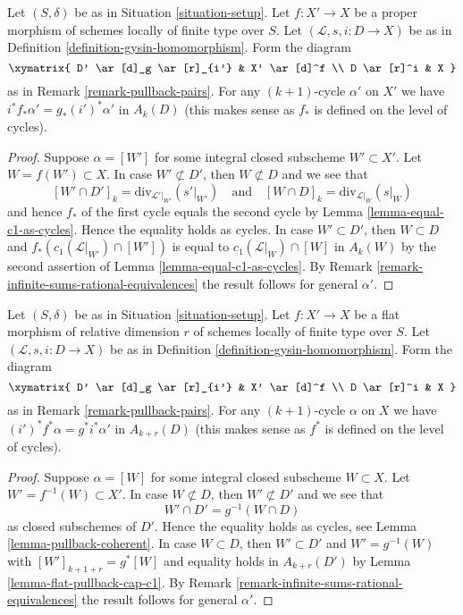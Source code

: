 \begin{lemma}
\label{lemma-closed-in-X-gysin}
Let $(S, \delta)$ be as in Situation \ref{situation-setup}.
Let $f : X' \to X$ be a proper morphism of schemes
locally of finite type over $S$.
Let $(\mathcal{L}, s, i : D \to X)$ be as in
Definition \ref{definition-gysin-homomorphism}.
Form the diagram
$$
\xymatrix{
D' \ar[d]_g \ar[r]_{i'} & X' \ar[d]^f \\
D \ar[r]^i & X
}
$$
as in Remark \ref{remark-pullback-pairs}.
For any $(k + 1)$-cycle $\alpha'$ on $X'$ we have
$i^*f_*\alpha' = g_*(i')^*\alpha'$ in $A_k(D)$
(this makes sense as $f_*$ is defined on the level of cycles).
\end{lemma}

\begin{proof}
Suppose $\alpha = [W']$ for some integral closed subscheme
$W' \subset X'$. Let $W = f(W') \subset X$. In case $W' \not \subset D'$,
then $W \not \subset D$ and we see that
$$
[W' \cap D']_k = \text{div}_{\mathcal{L}'|_{W'}}({s'|_{W'}})
\quad\text{and}\quad
[W \cap D]_k = \text{div}_{\mathcal{L}|_W}(s|_W)
$$
and hence $f_*$ of the first cycle equals the second cycle by
Lemma \ref{lemma-equal-c1-as-cycles}. Hence the
equality holds as cycles. In case $W' \subset D'$, then
$W \subset D$ and $f_*(c_1(\mathcal{L}|_{W'}) \cap [W'])$
is equal to $c_1(\mathcal{L}|_W) \cap [W]$ in $A_k(W)$ by the second
assertion of Lemma \ref{lemma-equal-c1-as-cycles}.
By Remark \ref{remark-infinite-sums-rational-equivalences}
the result follows for general $\alpha'$.
\end{proof}

\begin{lemma}
\label{lemma-gysin-flat-pullback}
Let $(S, \delta)$ be as in Situation \ref{situation-setup}. Let $f : X' \to X$
be a flat morphism of relative dimension $r$ of schemes locally of finite type
over $S$. Let $(\mathcal{L}, s, i : D \to X)$ be as in
Definition \ref{definition-gysin-homomorphism}. Form the diagram
$$
\xymatrix{
D' \ar[d]_g \ar[r]_{i'} & X' \ar[d]^f \\
D \ar[r]^i & X
}
$$
as in Remark \ref{remark-pullback-pairs}.
For any $(k + 1)$-cycle $\alpha$ on $X$ we have
$(i')^*f^*\alpha = g^*i^*\alpha'$ in $A_{k + r}(D)$
(this makes sense as $f^*$ is defined on the level of cycles).
\end{lemma}

\begin{proof}
Suppose $\alpha = [W]$ for some integral closed subscheme
$W \subset X$. Let $W' = f^{-1}(W) \subset X'$. In case $W \not \subset D$,
then $W' \not \subset D'$ and we see that
$$
W' \cap D' = g^{-1}(W \cap D)
$$
as closed subschemes of $D'$. Hence the
equality holds as cycles, see Lemma \ref{lemma-pullback-coherent}.
In case $W \subset D$, then $W' \subset D'$ and $W' = g^{-1}(W)$
with $[W']_{k + 1 + r} = g^*[W]$ and equality holds in
$A_{k + r}(D')$ by Lemma \ref{lemma-flat-pullback-cap-c1}.
By Remark \ref{remark-infinite-sums-rational-equivalences}
the result follows for general $\alpha'$.
\end{proof}








